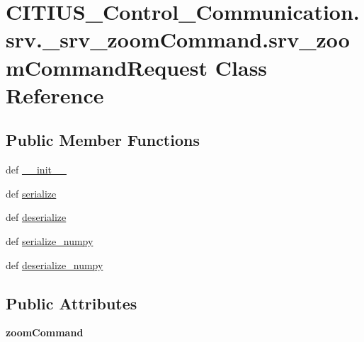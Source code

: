 \hypertarget{class_c_i_t_i_u_s___control___communication_1_1srv_1_1__srv__zoom_command_1_1srv__zoom_command_request}{\section{\-C\-I\-T\-I\-U\-S\-\_\-\-Control\-\_\-\-Communication.\-srv.\-\_\-srv\-\_\-zoom\-Command.\-srv\-\_\-zoom\-Command\-Request \-Class \-Reference}
\label{class_c_i_t_i_u_s___control___communication_1_1srv_1_1__srv__zoom_command_1_1srv__zoom_command_request}
}
\subsection*{\-Public \-Member \-Functions}
\begin{DoxyCompactItemize}
\item 
def \hyperlink{class_c_i_t_i_u_s___control___communication_1_1srv_1_1__srv__zoom_command_1_1srv__zoom_command_request_a757878163e33bd3da767913dc15e771d}{\-\_\-\-\_\-init\-\_\-\-\_\-}
\item 
def \hyperlink{class_c_i_t_i_u_s___control___communication_1_1srv_1_1__srv__zoom_command_1_1srv__zoom_command_request_aab4710270a947a1d2d25a3412f619c0e}{serialize}
\item 
def \hyperlink{class_c_i_t_i_u_s___control___communication_1_1srv_1_1__srv__zoom_command_1_1srv__zoom_command_request_a0c26d887e3fe615c051f9f541066e9ae}{deserialize}
\item 
def \hyperlink{class_c_i_t_i_u_s___control___communication_1_1srv_1_1__srv__zoom_command_1_1srv__zoom_command_request_af765ff49161be99c1be145ea01ea80dc}{serialize\-\_\-numpy}
\item 
def \hyperlink{class_c_i_t_i_u_s___control___communication_1_1srv_1_1__srv__zoom_command_1_1srv__zoom_command_request_af5df63ec7e96d21dd1d944ca6c7c3c94}{deserialize\-\_\-numpy}
\end{DoxyCompactItemize}
\subsection*{\-Public \-Attributes}
\begin{DoxyCompactItemize}
\item 
\hypertarget{class_c_i_t_i_u_s___control___communication_1_1srv_1_1__srv__zoom_command_1_1srv__zoom_command_request_a4419d9d7c61e65f1f0e5195814f7e83f}{{\bfseries zoom\-Command}}\label{class_c_i_t_i_u_s___control___communication_1_1srv_1_1__srv__zoom_command_1_1srv__zoom_command_request_a4419d9d7c61e65f1f0e5195814f7e83f}

\end{DoxyCompactItemize}
